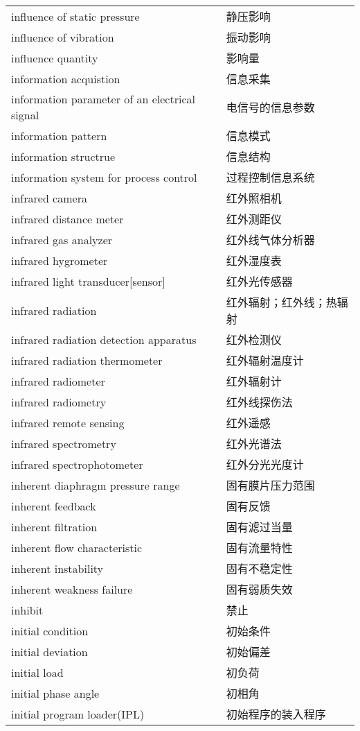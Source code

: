 \documentclass[
]{article}
\begin{document}
\begin{longtable}[]{@{}ll@{}}
influence of static pressure & 静压影响 \\
influence of vibration & 振动影响 \\
influence quantity & 影响量 \\
information acquistion & 信息采集 \\
information parameter of an electrical signal & 电信号的信息参数 \\
information pattern & 信息模式 \\
information structrue & 信息结构 \\
information system for process control & 过程控制信息系统 \\
infrared camera & 红外照相机 \\
infrared distance meter & 红外测距仪 \\
infrared gas analyzer & 红外线气体分析器 \\
infrared hygrometer & 红外湿度表 \\
infrared light transducer{[}sensor{]} & 红外光传感器 \\
infrared radiation & 红外辐射；红外线；热辐射 \\
infrared radiation detection apparatus & 红外检测仪 \\
infrared radiation thermometer & 红外辐射温度计 \\
infrared radiometer & 红外辐射计 \\
infrared radiometry & 红外线探伤法 \\
infrared remote sensing & 红外遥感 \\
infrared spectrometry & 红外光谱法 \\
infrared spectrophotometer & 红外分光光度计 \\
inherent diaphragm pressure range & 固有膜片压力范围 \\
inherent feedback & 固有反馈 \\
inherent filtration & 固有滤过当量 \\
inherent flow characteristic & 固有流量特性 \\
inherent instability & 固有不稳定性 \\
inherent weakness failure & 固有弱质失效 \\
inhibit & 禁止 \\
initial condition & 初始条件 \\
initial deviation & 初始偏差 \\
initial load & 初负荷 \\
initial phase angle & 初相角 \\
initial program loader(IPL) & 初始程序的装入程序 \\

\end{longtable}
\end{document}
